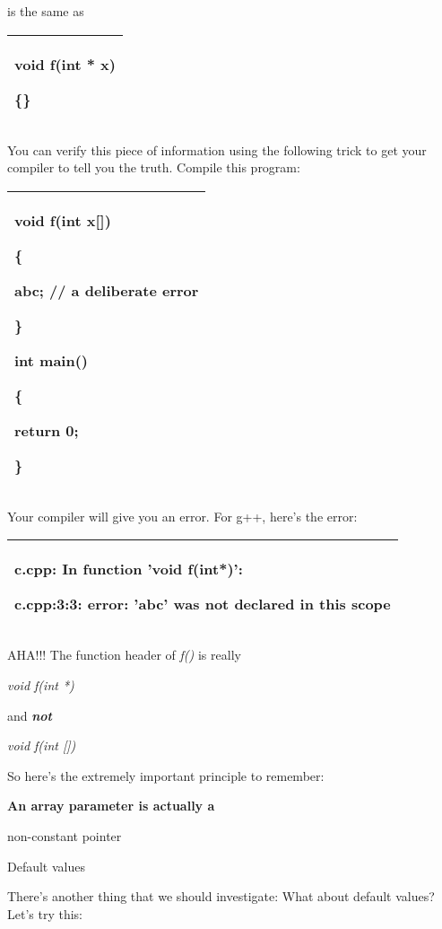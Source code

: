 \documentclass[
]{article}
\begin{document}
is the same as

\begin{longtable}[]{@{}l@{}}
\toprule
\endhead
\begin{minipage}[t]{0.97\columnwidth}\raggedright
void f(int * x)

\{\}\strut
\end{minipage}\tabularnewline
\bottomrule
\end{longtable}

You can verify this piece of information using the following trick to
get your compiler to tell you the truth. Compile this program:

\begin{longtable}[]{@{}l@{}}
\toprule
\endhead
\begin{minipage}[t]{0.97\columnwidth}\raggedright
void f(int x{[}{]})

\{

abc; // a deliberate error

\}

int main()

\{

return 0;

\}\strut
\end{minipage}\tabularnewline
\bottomrule
\end{longtable}

Your compiler will give you an error. For g++, here's the error:

\begin{longtable}[]{@{}l@{}}
\toprule
\endhead
\begin{minipage}[t]{0.97\columnwidth}\raggedright
c.cpp: In function 'void f(int*)':

c.cpp:3:3: error: 'abc' was not declared in this scope\strut
\end{minipage}\tabularnewline
\bottomrule
\end{longtable}

AHA!!! The function header of \emph{f()} is really

\emph{void f(int *)}

and \emph{\textbf{not}}

\emph{void f(int {[}{]})}

So here's the extremely important principle to remember:

\textbf{An array parameter is actually a }

non-constant pointer

Default values

There's another thing that we should investigate: What about default
values? Let's try this:
\end{document}
